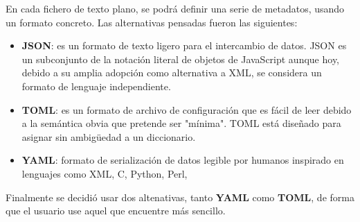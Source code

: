En cada fichero de texto plano, se podrá definir una serie de metadatos, usando un formato concreto. Las alternativas pensadas fueron
las siguientes:

\begin{itemize}
\item \textbf{JSON}: es un formato de texto ligero para el intercambio de datos. JSON es un subconjunto de la notación literal de
objetos de JavaScript aunque hoy, debido a su amplia adopción como alternativa a XML, se considera un formato de lenguaje independiente.
\item \textbf{TOML}: es un formato de archivo de configuración que es fácil de leer debido a la semántica obvia que pretende ser
"mínima". TOML está diseñado para asignar sin ambigüedad a un diccionario.
\item \textbf{YAML}: formato de serialización de datos legible por humanos inspirado en lenguajes como XML, C, Python, Perl,
\end{itemize}


Finalmente se decidió usar dos altenativas, tanto \textbf{YAML} como \textbf{TOML}, de forma que el usuario use aquel que encuentre más
sencillo.
